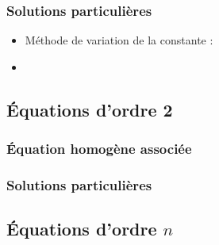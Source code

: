 \subsubsection{Solutions particulières}
\begin{itemize}
    \item Méthode de variation de la constante :
    \item 
\end{itemize}
\subsection{Équations d'ordre 2}
\subsubsection{Équation homogène associée}
\subsubsection{Solutions particulières}
\subsection{Équations d'ordre $n$}
